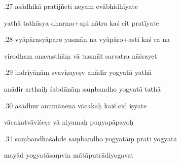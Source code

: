 \documentclass[article,12pt,a4paper]{memoir}%
\newcounter{parCount}
\begin{document}
	  
	  \pstart {}.27 asādhikā pratijñeti neyam evābhidhīyate 
	{}
	\pend%
      

	  
	  \pstart \leavevmode%
	yathā tathāsya dharmo+api nātra kaś cit pratīyate 
	{}
	\pend%
      

	  
	  \pstart {}.28 vyāpārasyāparo yasmān na vyāpāro+asti kaś ca na 
	{}
	\pend%
      

	  
	  \pstart \leavevmode%
	virodham anavasthāṃ vā tasmāt sarvatra nāśrayet 
	{}
	\pend%
      

	  
	  \pstart {}.29 indriyāṇāṃ svaviṣayeṣv anādir yogyatā yathā 
	{}
	\pend%
      

	  
	  \pstart \leavevmode%
	anādir arthaiḥ śabdānāṃ saṃbandho yogyatā tathā 
	{}
	\pend%
      

	  
	  \pstart {}.30 asādhur anumānena vācakaḥ kaiś cid iṣyate 
	{}
	\pend%
      

	  
	  \pstart \leavevmode%
	vācakatvāviśeṣe vā niyamaḥ puṇyapāpayoḥ 
	{}
	\pend%
      

	  
	  \pstart {}.31 saṃbandhaśabde saṃbandho yogyatāṃ prati yogyatā 
	{}
	\pend%
      

	  
	  \pstart \leavevmode%
	mayād yogyatāsaṃvin mātāputrādiyogavat 
	{}
	\pend%
      
\end{document}
